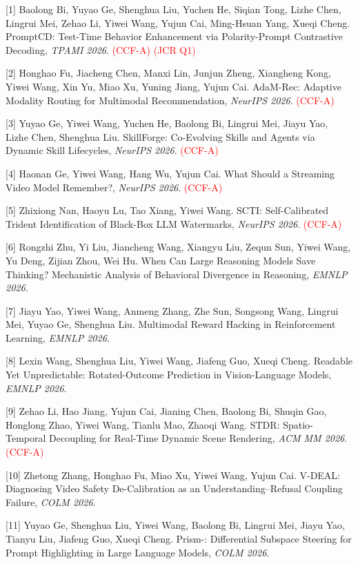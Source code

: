 [1] Baolong Bi, Yuyao Ge, Shenghua Liu, Yuchen He, Siqian Tong, Lizhe Chen, Lingrui Mei, Zehao Li, Yiwei Wang, Yujun Cai, Ming-Hsuan Yang, Xueqi Cheng. PromptCD: Test-Time Behavior Enhancement via Polarity-Prompt Contrastive Decoding, \textit{TPAMI 2026}. \textcolor{red}{(CCF-A)} \textcolor{red}{(JCR Q1)}

[2] Honghao Fu, Jiacheng Chen, Manxi Lin, Junjun Zheng, Xiangheng Kong, Yiwei Wang, Xin Yu, Miao Xu, Yuning Jiang, Yujun Cai. AdaM-Rec: Adaptive Modality Routing for Multimodal Recommendation, \textit{NeurIPS 2026}. \textcolor{red}{(CCF-A)}

[3] Yuyao Ge, Yiwei Wang, Yuchen He, Baolong Bi, Lingrui Mei, Jiayu Yao, Lizhe Chen, Shenghua Liu. SkillForge: Co-Evolving Skills and Agents via Dynamic Skill Lifecycles, \textit{NeurIPS 2026}. \textcolor{red}{(CCF-A)}

[4] Haonan Ge, Yiwei Wang, Hang Wu, Yujun Cai. What Should a Streaming Video Model Remember?, \textit{NeurIPS 2026}. \textcolor{red}{(CCF-A)}

[5] Zhixiong Nan, Haoyu Lu, Tao Xiang, Yiwei Wang. SCTI: Self-Calibrated Trident Identification of Black-Box LLM Watermarks, \textit{NeurIPS 2026}. \textcolor{red}{(CCF-A)}

[6] Rongzhi Zhu, Yi Liu, Jiancheng Wang, Xiangyu Liu, Zequn Sun, Yiwei Wang, Yu Deng, Zijian Zhou, Wei Hu. When Can Large Reasoning Models Save Thinking? Mechanistic Analysis of Behavioral Divergence in Reasoning, \textit{EMNLP 2026}.

[7] Jiayu Yao, Yiwei Wang, Anmeng Zhang, Zhe Sun, Songsong Wang, Lingrui Mei, Yuyao Ge, Shenghua Liu. Multimodal Reward Hacking in Reinforcement Learning, \textit{EMNLP 2026}.

[8] Lexin Wang, Shenghua Liu, Yiwei Wang, Jiafeng Guo, Xueqi Cheng. Readable Yet Unpredictable: Rotated-Outcome Prediction in Vision-Language Models, \textit{EMNLP 2026}.

[9] Zehao Li, Hao Jiang, Yujun Cai, Jianing Chen, Baolong Bi, Shuqin Gao, Honglong Zhao, Yiwei Wang, Tianlu Mao, Zhaoqi Wang. {STDR}: Spatio-Temporal Decoupling for Real-Time Dynamic Scene Rendering, \textit{ACM MM 2026}. \textcolor{red}{(CCF-A)}

[10] Zhetong Zhang, Honghao Fu, Miao Xu, Yiwei Wang, Yujun Cai. V-DEAL: Diagnosing Video Safety De-Calibration as an Understanding--Refusal Coupling Failure, \textit{COLM 2026}.

[11] Yuyao Ge, Shenghua Liu, Yiwei Wang, Baolong Bi, Lingrui Mei, Jiayu Yao, Tianyu Liu, Jiafeng Guo, Xueqi Cheng. Prism-: Differential Subspace Steering for Prompt Highlighting in Large Language Models, \textit{COLM 2026}.


